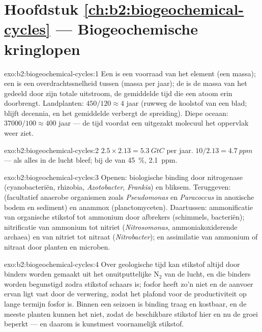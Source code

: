 \section*{Hoofdstuk \ref{ch:b2:biogeochemical-cycles} --- Biogeochemische kringlopen}

\begin{solution}{exo:b2:biogeochemical-cycles:1}
Een  is een voorraad van het element (een massa); een  is een
overdrachtssnelheid tussen  (massa per jaar); de  is
de massa van het  gedeeld door zijn totale uitstroom, de gemiddelde
tijd die een atoom erin doorbrengt. Landplanten: $450/120 \approx 4$ jaar
(ruwweg de koolstof van een blad;  blijft decennia, en het gemiddelde
verbergt de spreiding). Diepe oceaan: $37000/100 \approx 400$ jaar --- de tijd
voordat een uitgezakt molecuul het oppervlak weer ziet.
\end{solution}

\begin{solution}{exo:b2:biogeochemical-cycles:2}
$2.5\times 2.13 = \qty{5.3}{GtC}$ per jaar. $10/2.13 = \qty{4.7}{ppm}$
--- als alles in de lucht bleef; bij de  van
\qty{45}{\%}, \qty{2.1}{ppm}.
\end{solution}

\begin{solution}{exo:b2:biogeochemical-cycles:3}
Openen: biologische binding door nitrogenase (cyanobacteriën,
rhizobia, \emph{Azotobacter}, \emph{Frankia}) en bliksem. Teruggeven:
 (facultatief anaerobe organismen zoals \emph{Pseudomonas}
en \emph{Paracoccus} in anoxische bodem en sediment) en anammox
(planctomyceten). Daartussen: ammonificatie van organische stikstof tot
ammonium door afbrekers (schimmels, bacteriën); nitrificatie van
ammonium tot nitriet (\emph{Nitrosomonas}, ammoniakoxiderende
archaea) en van nitriet tot nitraat (\emph{Nitrobacter}); en
assimilatie van ammonium of nitraat door planten en microben.
\end{solution}

\begin{solution}{exo:b2:biogeochemical-cycles:4}
Over geologische tijd kan stikstof altijd door binders worden gemaakt uit het
onuitputtelijke $\mathrm{N_2}$ van de lucht, en die binders worden begunstigd
zodra stikstof schaars is; fosfor heeft zo'n  niet en
de aanvoer ervan ligt vast door de verwering, zodat het plafond voor de
productiviteit op lange termijn fosfor is. Binnen een seizoen is binding traag
en kostbaar, en de meeste planten kunnen het niet, zodat de beschikbare
stikstof hier en nu de groei beperkt --- en daarom is kunstmest
voornamelijk stikstof.
\end{solution}

